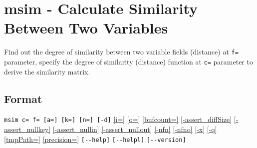 
%

\section{msim - Calculate Similarity Between Two Variables\label{sect:msim}}

Find out the degree of similarity between two variable fields (distance) at \verb|f=| parameter, specify the degree of  similarity (distance) function at \verb|c=| parameter to derive the similarity matrix.

\subsection*{Format}
\verb/msim c= f= [a=] [k=] [n=] [-d]/
\hyperref[sect:option_i]{[i=]}
\hyperref[sect:option_o]{[o=]}
\hyperref[sect:option_bufcount]{[bufcount=]} 
\hyperref[sect:option_assert_diffSize]{[-assert\_diffSize]}
\hyperref[sect:option_assert_nullkey]{[-assert\_nullkey]}
\hyperref[sect:option_assert_nullin]{[-assert\_nullin]}
\hyperref[sect:option_assert_nullout]{[-assert\_nullout]}
\hyperref[sect:option_nfn]{[-nfn]} 
\hyperref[sect:option_nfno]{[-nfno]}  
\hyperref[sect:option_x]{[-x]}
\hyperref[sect:option_x]{[-q]}
\hyperref[sect:option_option_tmppath]{[tmpPath=]}
\hyperref[sect:option_precision]{[precision=]}
\verb|[--help]|
\verb|[--helpl]|
\verb|[--version]|\\


